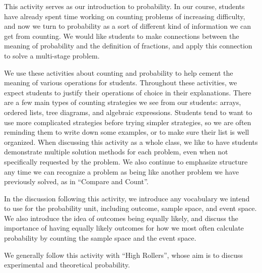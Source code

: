 \documentclass{ximera}
\begin{document}
\newpage
\begin{instructorNotes}
This activity serves as our introduction to probability.  In our course, students have already spent time working on counting problems of increasing difficulty, and now we turn to probability as a sort of different kind of information we can get from counting.  We would like students to make connections between the meaning of probability and the definition of fractions, and apply this connection to solve a multi-stage problem.

We use these activities about counting and probability to help cement the meaning of various operations for students.  Throughout these activities, we expect students to justify their operations of choice in their explanations.  There are a few main types of counting strategies we see from our students: arrays, ordered lists, tree diagrams, and algebraic expressions.  Students tend to want to use more complicated strategies before trying simpler strategies, so we are often reminding them to write down some examples, or to make sure their list is well organized. When discussing this activity as a whole class, we like to have students demonstrate multiple solution methods for each problem, even when not specifically requested by the problem.  We also continue to emphasize structure any time we can recognize a problem as being like another problem we have previously solved, as in ``Compare and Count''.

In the discussion following this activity, we introduce any vocabulary we intend to use for the probability unit, including outcome, sample space, and event space.  We also introduce the idea of outcomes being equally likely, and discuss the importance of having equally likely outcomes for how we most often calculate probability by counting the sample space and the event space.

We generally follow this activity with ``High Rollers'', whose aim is to discuss experimental and theoretical probability.

\end{instructorNotes}
\end{document}
